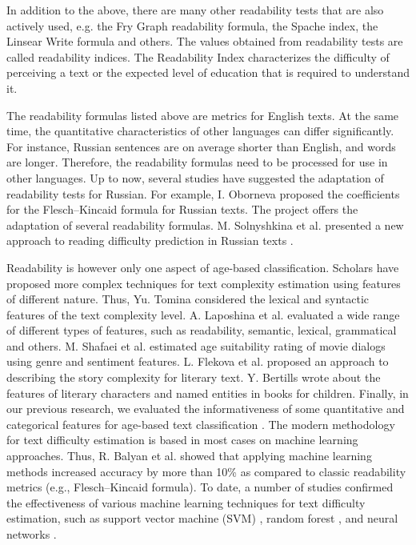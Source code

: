 \documentclass[runningheads]{llncs}
\begin{document}
In addition to the above, there are many other readability tests that are also actively used, e.g. the Fry Graph readability formula, the Spache index, the Linsear Write formula and others. The values obtained from readability tests are called readability indices. The Readability Index characterizes the difficulty of perceiving a text or the expected level of education that is required to understand it.

The readability formulas listed above are metrics for English texts. At the same time, the quantitative characteristics of other languages can differ significantly. For instance, Russian sentences are on average shorter than English, and words are longer. Therefore, the readability formulas need to be processed for use in other languages. Up to now, several studies have suggested the adaptation of readability tests for Russian. For example, I. Oborneva \cite{Oborneva} proposed the coefficients for the Flesch–Kincaid formula for Russian texts. The project \cite{readability} offers the adaptation of several readability formulas. M. Solnyshkina et al. presented a new approach to reading difficulty prediction in Russian texts \cite{Solnyshkina,Solovyev}. 

Readability is however only one aspect of age-based classification. Scholars have proposed more complex techniques for text complexity estimation using features of different nature. Thus, Yu. Tomina \cite{Tomina} considered the lexical and syntactic features of the text complexity level. A. Laposhina et al. \cite{Laposhina} evaluated a wide range of different types of features, such as readability, semantic, lexical, grammatical and others. M. Shafaei et al. \cite{Shafaei} estimated age suitability rating of movie dialogs using genre and sentiment features. L. Flekova et al. \cite{Flekova} proposed an approach to describing the story complexity for literary text. Y. Bertills \cite{Bertills} wrote about the features of literary characters and named entities in books for children. Finally, in our previous research, we evaluated the informativeness of some quantitative and categorical features for age-based text classification \cite{Glazkova}. The modern methodology for text difficulty estimation is based in most cases on machine learning approaches. Thus, R. Balyan et al. \cite{Balyan} showed that applying machine learning methods increased accuracy by more than 10\% as compared to classic readability metrics (e.g., Flesch–Kincaid formula). To date, a number of studies confirmed the effectiveness of various machine learning techniques for text difficulty estimation, such as support vector machine (SVM) \cite{Schwarm,Sung}, random forest \cite{Mukherjee}, and neural networks \cite{Azpiazu,Cuzzocrea,Schicchi}.
\end{document}
